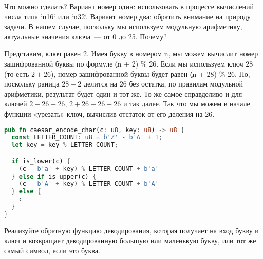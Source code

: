 Что можно сделать?
Вариант номер один: использовать в процессе вычислений числа типа `u16` или `u32`.
Вариант номер два: обратить внимание на природу задачи.
В нашем случае, поскольку мы используем модульную арифметику, актуальные значения ключа~--- от 0 до 25.
Почему?

Представим, ключ равен 2. Имея букву в номером \c{n}, мы можем вычислит номер зашифрованной буквы по формуле \c{(n + 2) \% 26}.
Если мы используем ключ 28 (то есть $2 + 26$), номер зашифрованной буквы будет равен \c{(n + 28) \% 26}.
Но, поскольку раница $28-2$ делится на 26 без остатка, по правилам модульной арифметики, результат будет один и тот же.
То же самое справделиво и для ключей $2 + 26 + 26$, $2 + 26 + 26 + 26$ и так далее.
Так что мы можем в начале функции «урезать» ключ, вычислив отстаток от его деления на 26.

\begin{lstlisting}[language=Rust]
pub fn caesar_encode_char(c: u8, key: u8) -> u8 {
  const LETTER_COUNT: u8 = b'Z' - b'A' + 1;
  let key = key % LETTER_COUNT;

  if is_lower(c) {
    (c - b'a' + key) % LETTER_COUNT + b'a'
  } else if is_upper(c) {
    (c - b'A' + key) % LETTER_COUNT + b'A'
  } else {
    c
  }
}
\end{lstlisting}

\begin{Exercise}
  \Question
  Реализуйте обратную функцию декодирования, которая получает на вход букву и ключ и возвращает декодированную большую или маленькую букву, или тот же самый символ, если это буква.
\end{Exercise}
